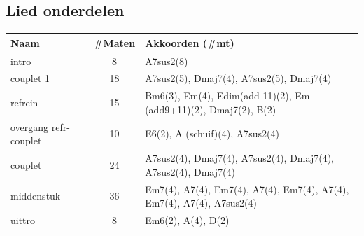 \documentclass[a4paper,11pt]{article}
\begin{document}
\vspace{0.5cm}
\subsection*{Lied onderdelen}

\begin{tabular}{l|c|p{8cm}}
\hline
\textbf{Naam} & \textbf{\#Maten} & \textbf{Akkoorden (\#mt)} \\
\hline
intro & 8 & A7sus2(8) \\
couplet 1 & 18 & A7sus2(5), Dmaj7(4), A7sus2(5), Dmaj7(4) \\
refrein & 15 & Bm6(3), Em(4), Edim(add 11)(2), Em (add9+11)(2), Dmaj7(2), B(2) \\
overgang refr-couplet & 10 & E6(2), A (schuif)(4), A7sus2(4) \\
couplet & 24 & A7sus2(4), Dmaj7(4), A7sus2(4), Dmaj7(4), A7sus2(4), Dmaj7(4) \\
middenstuk & 36 & Em7(4), A7(4), Em7(4), A7(4), Em7(4), A7(4), Em7(4), A7(4), A7sus2(4) \\
uittro & 8 & Em6(2), A(4), D(2) \\
\hline
\end{tabular}
\end{document}
